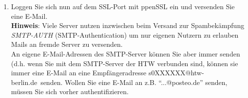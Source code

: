 \documentclass[paper=a4,fontsize=11pt]{scrartcl}%
\numberwithin{equation}{section}
\begin{document}
\begin{enumerate}
 	\item Loggen Sie sich nun auf dem SSL-Port mit ppenSSL ein und versenden Sie eine E-Mail.\\
 	\textbf{Hinweis}: Viele Server nutzen inzwischen beim Versand zur Spambekämpfung \emph{SMTP-AUTH} (SMTP-Authentication) um nur eigenen Nutzern zu erlauben Mails an fremde Server zu versenden.\\
 	An eigene E-Mail-Adressen des SMTP-Server können Sie aber immer senden (d.h. wenn Sie mit dem SMTP-Server der HTW verbunden sind, können sie immer eine E-Mail an eine Empfängeradresse \glqq s0XXXXXX@htw-berlin.de\grqq\ senden. Wollen Sie eine E-Mail an z.B. "`...@posteo.de"' senden, müssen Sie sich vorher authentifizieren.
\end{enumerate}
\end{document}

